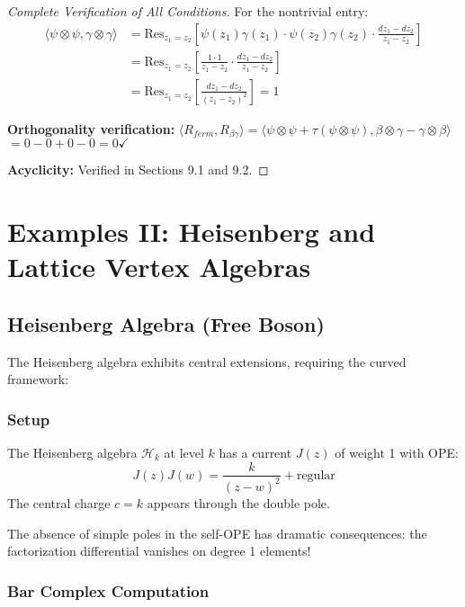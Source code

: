 \begin{proof}[Complete Verification of All Conditions]
For the nontrivial entry:
\begin{align}
\langle\psi \otimes \psi, \gamma \otimes \gamma\rangle &= \text{Res}_{z_1=z_2}\left[\psi(z_1)\gamma(z_1) \cdot \psi(z_2)\gamma(z_2) \cdot \frac{dz_1-dz_2}{z_1-z_2}\right]\\
&= \text{Res}_{z_1=z_2}\left[\frac{1 \cdot 1}{z_1-z_2} \cdot \frac{dz_1-dz_2}{z_1-z_2}\right]\\
&= \text{Res}_{z_1=z_2}\left[\frac{dz_1-dz_2}{(z_1-z_2)^2}\right] = 1
\end{align}

\textbf{Orthogonality verification:}
$\langle R_{ferm}, R_{\beta\gamma}\rangle = \langle\psi \otimes \psi + \tau(\psi \otimes \psi), \beta \otimes \gamma - \gamma \otimes \beta\rangle$
$= 0 - 0 + 0 - 0 = 0 \checkmark$

\textbf{Acyclicity:} Verified in Sections 9.1 and 9.2.
\end{proof}
 


\section{Examples II: Heisenberg and Lattice Vertex Algebras}
 
\subsection{Heisenberg Algebra (Free Boson)}
 
The Heisenberg algebra exhibits central extensions, requiring the curved framework:
 
\subsubsection{Setup}
 
\begin{definition}
The Heisenberg algebra $\mathcal{H}_k$ at level $k$ has a current $J(z)$ of weight 1 with OPE:
\[
J(z)J(w) = \frac{k}{(z-w)^2} + \text{regular}
\]
The central charge $c = k$ appears through the double pole.
\end{definition}
 
\begin{remark}
The absence of simple poles in the self-OPE has dramatic consequences: the factorization differential 
vanishes on degree 1 elements!
\end{remark}
 
\subsubsection{Bar Complex Computation}
 
